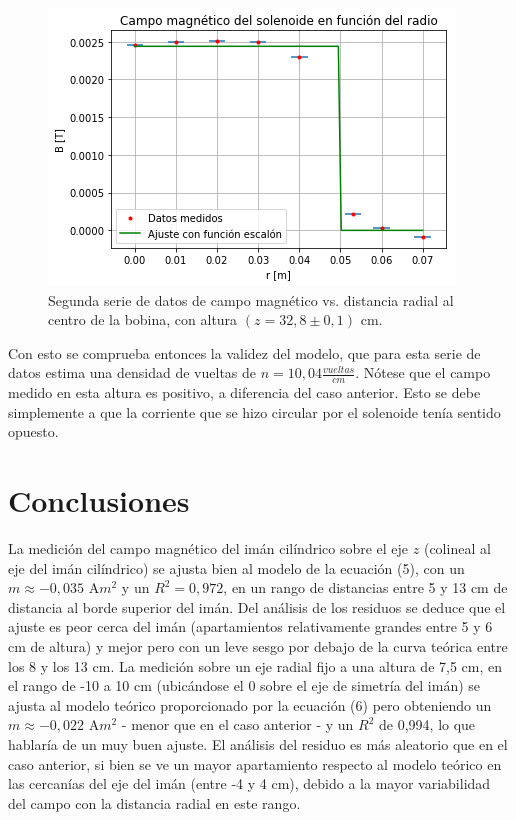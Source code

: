 \documentclass[12pt]{article}
\begin{document}
\begin{figure}[H]
\centering
\includegraphics[scale=0.65]{solalto.png}
\caption{Segunda serie de datos de campo magnético vs. distancia radial al centro de la bobina, con altura $(z=32,8 \pm 0,1)$ cm. }
\label{solalto}
\end{figure}

Con esto se comprueba entonces la validez del modelo, que para esta serie de datos estima una densidad de vueltas de  $n=10,04 \frac{vueltas}{cm}$. Nótese que el campo medido en esta altura es positivo, a diferencia del caso anterior. Esto se debe simplemente a que la corriente que se hizo circular por el solenoide tenía sentido opuesto.\\


\section{Conclusiones}

La medición del campo magnético del imán cilíndrico sobre el eje $z$ (colineal al eje del imán cilíndrico) se ajusta bien al modelo de la ecuación (5), con un $m\approx -0,035$ A$m^{2}$ y un $R^2=0,972$, en un rango de distancias entre 5 y 13 cm de distancia al borde superior del imán. Del análisis de los residuos se deduce que el ajuste es peor cerca del imán (apartamientos relativamente grandes entre 5 y 6 cm de altura) y mejor pero con un leve sesgo por debajo de la curva teórica entre los 8 y los 13 cm. La medición sobre un eje radial fijo a una altura de 7,5 cm, en el rango de -10 a 10 cm (ubicándose el 0 sobre el eje de simetría del imán) se ajusta al modelo teórico proporcionado por la ecuación (6) pero obteniendo un $m\approx -0,022$ A$m^{2}$ - menor que en el caso anterior - y un $R^2$ de 0,994, lo que hablaría de un muy buen ajuste. El análisis del residuo es más aleatorio que en el caso anterior, si bien se ve un mayor apartamiento respecto al modelo teórico en las cercanías del eje del imán (entre -4 y 4 cm), debido a la mayor variabilidad del campo con la distancia radial en este rango.\\
\end{document}
